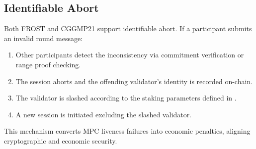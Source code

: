 \subsection{Identifiable Abort}

Both FROST and CGGMP21 support identifiable abort. If a participant submits an invalid round message:

\begin{enumerate}
\item Other participants detect the inconsistency via commitment verification or range proof checking.
\item The session aborts and the offending validator's identity is recorded on-chain.
\item The validator is slashed according to the staking parameters defined in \cite{zoo-tokenomics}.
\item A new session is initiated excluding the slashed validator.
\end{enumerate}

This mechanism converts MPC liveness failures into economic penalties, aligning cryptographic and economic security.

